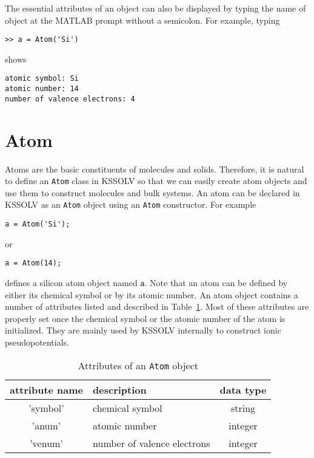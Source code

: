 \documentclass[11pt]{book}
\begin{document}
The essential attributes of an object can also be displayed by typing
the name of object at the MATLAB prompt without a semicolon. 
For example, typing 
\begin{verbatim}
>> a = Atom('Si')
\end{verbatim}
shows
\begin{verbatim}
atomic symbol: Si
atomic number: 14
number of valence electrons: 4
\end{verbatim}

\section{Atom}
Atoms are the basic constituents of molecules and solids. Therefore, it
is natural to define an {\tt Atom} class in KSSOLV so that we can easily 
create atom objects and use them to construct molecules and bulk systems.
An atom can be declared in KSSOLV as an {\tt Atom} object using an {\tt Atom} 
constructor. For example
\begin{verbatim}
a = Atom('Si'); 
\end{verbatim}
or
\begin{verbatim}
a = Atom(14);
\end{verbatim}
defines a silicon atom object named {\tt a}.  Note that an atom can be 
defined by either its chemical symbol or by its atomic number. An 
atom object contains a number of attributes listed and described
in Table~\ref{atomattr}. Most of these attributes are properly set
once the chemical symbol or the atomic number of the atom is initialized.
They are mainly used by KSSOLV internally to construct ionic pseudopotentials.

\begin{table}[htbp]
\center
\begin{tabular}{|c|l|c|} \hline
attribute name &  description          & data type  \\ \hline
'symbol' & chemical symbol             & string  \\
'anum'   & atomic number               & integer \\
'venum'  & number of valence electrons & integer \\
\hline
\end{tabular}
\caption{Attributes of an {\tt Atom} object }
\label{atomattr}
\end{table}
\end{document}
